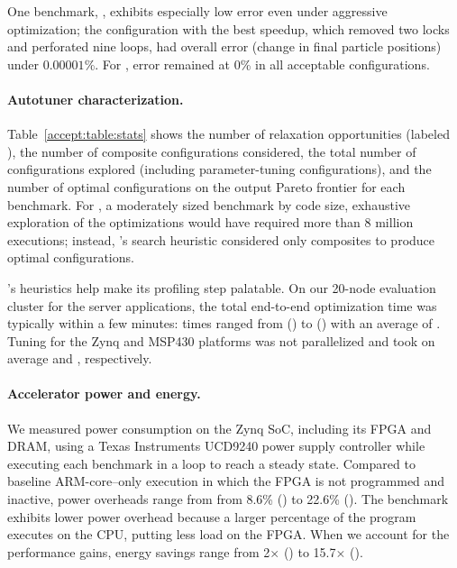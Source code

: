 One benchmark, , exhibits especially low error even under
aggressive optimization;
the configuration with the best speedup,
which removed two locks and perforated nine loops, had
overall error (change in final particle positions) under $0.00001$\%.  For
, error remained at $0$\% in all acceptable
configurations.

\paragraph{Autotuner characterization.}

Table~\ref{accept:table:stats} shows
the number of relaxation opportunities (labeled ), the number of
composite configurations considered, the total number of configurations
explored (including parameter-tuning configurations),
and the number of optimal configurations on the output Pareto frontier
for each benchmark.
For , a moderately sized benchmark by code size,
exhaustive exploration of the 
optimizations would
have required more than 8 million executions;
instead, \sysname's search heuristic considered only
 composites
to produce  optimal configurations.

\sysname's heuristics help make its profiling step palatable.
On our 20-node evaluation cluster for the server applications, the total end-to-end optimization time was
typically within a few minutes: times ranged from 
() to 
() with an
average of .
Tuning for the Zynq and MSP430 platforms was not parallelized and took
 on average and
, respectively.

\paragraph{Accelerator power and energy.}
We measured power consumption on the Zynq SoC, including its FPGA and DRAM,
using a Texas Instruments UCD9240 power supply controller while executing each
benchmark in a loop to reach a steady state.
Compared to baseline ARM-core--only execution in which the FPGA is
not programmed and inactive, power overheads range from
from 8.6\% ()
to 22.6\% ().
The  benchmark exhibits
lower power overhead because a larger percentage
of the program executes on the CPU, putting less load on the FPGA.
When we account for the performance gains, energy savings range from 2$\times$ () to 15.7$\times$ ().

